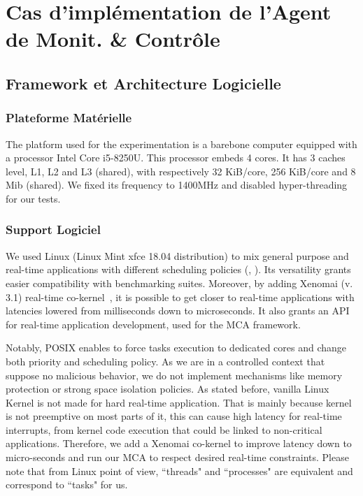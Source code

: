 \documentclass[french, a4paper, 11pt, twoside, pdftex]{StyleThese}
\begin{document}
\setcounter{chapter}{5} %
\dominitoc
\faketableofcontents
\fi

\chapter{Cas d'implémentation de l'Agent de Monit. \& Contrôle}
\minitoc

    \section{Framework et Architecture Logicielle}
    
        \subsection{Plateforme Matérielle}
                        The platform used for the experimentation is a barebone computer equipped with a processor Intel Core i5-8250U. This processor embeds 4 cores. It has 3 caches level, L1, L2 and L3 (shared), with respectively 32 KiB/core, 256 KiB/core and 8 Mib (shared). We fixed its frequency to 1400MHz and disabled hyper-threading for our tests.
        \subsection{Support Logiciel}
                    We used Linux (Linux Mint xfce 18.04 distribution) to mix general purpose and real-time applications with different scheduling policies (\cite{wong_towards_2008}, \cite{lelli_efficient_2011}). Its versatility grants easier compatibility with benchmarking suites. Moreover, by adding Xenomai (v. 3.1) real-time co-kernel~\cite{gerum_xenomai_2004}, it is possible to get closer to real-time applications with latencies lowered from milliseconds down to microseconds. It also grants an API for real-time application development, used for the MCA framework.
                        
                        Notably, POSIX enables to force tasks execution to dedicated cores and change both priority and scheduling policy. As we are in a controlled context that suppose no malicious behavior, we do not implement mechanisms like memory protection or strong space isolation policies. As stated before, vanilla Linux Kernel is not made for hard real-time application. That is mainly because kernel is not preemptive on most parts of it, this can cause high latency for real-time interrupts, from kernel code execution that could be linked to non-critical applications. %
                        Therefore, we add a Xenomai co-kernel to improve latency down to micro-seconds and run our MCA to respect desired real-time constraints.
                        Please note that from Linux point of view, ``threads" and ``processes" are equivalent and correspond to ``tasks" for us.
            
\end{document}
